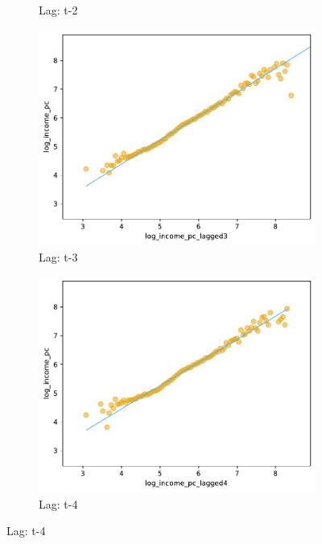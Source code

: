 \begin{figure}[H]
\begin{subfigure}[b]{0.47\textwidth}
             \caption{Lag: t-2}
         \end{subfigure} 
          \hfill
         \begin{subfigure}[b]{0.47\textwidth}
             \centering
             \includegraphics[width=\textwidth]{../figures/figA_income_vs_lagged3_income_log_log_scatterplot.pdf}
             \caption{Lag: t-3}
         \end{subfigure} 
          \hfill
         \begin{subfigure}[b]{0.47\textwidth}
             \centering
             \includegraphics[width=\textwidth]{../figures/figA_income_vs_lagged4_income_log_log_scatterplot.pdf}
             \caption{Lag: t-4}
         \end{subfigure} 
    \end{figure}


